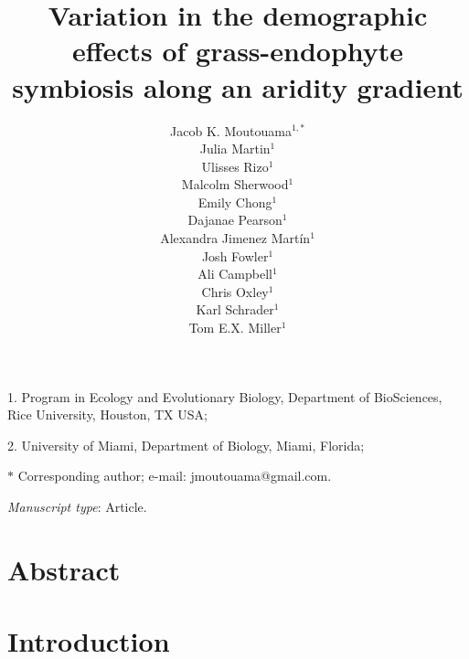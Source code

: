 \documentclass[11pt]{article}
\title{Variation in the demographic effects of grass-endophyte symbiosis along an aridity gradient }
\author{Jacob K. Moutouama$^{1,\ast}$ \\ 
Julia Martin$^{1}$ \\ 
Ulisses Rizo$^{1}$\\
Malcolm Sherwood$^{1}$\\
Emily Chong$^{1}$\\
Dajanae Pearson$^{1}$\\
Alexandra Jimenez Martín$^{1}$\\
Josh Fowler$^{1}$\\
Ali Campbell$^{1}$\\
Chris Oxley$^{1}$\\
Karl Schrader$^{1}$\\
Tom E.X. Miller$^{1}$\\}
\date{}
\begin{document}
\maketitle

\noindent{} 1. Program in Ecology and Evolutionary Biology, Department of BioSciences, Rice University, Houston, TX USA;

\noindent{} 2. University of Miami, Department of Biology, Miami, Florida;

\noindent{} $\ast$ Corresponding author; e-mail: jmoutouama@gmail.com.


\bigskip


\bigskip


\bigskip

\textit{Manuscript type}: Article. %

\bigskip


\linenumbers{}
\modulolinenumbers[1]

\newpage{}

\section*{Abstract}

\newpage{}

\section*{Introduction}

\end{document}

